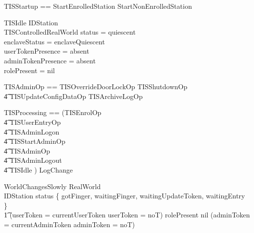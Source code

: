 \begin{zed}
        TISStartup == StartEnrolledStation \lor
        StartNonEnrolledStation
\end{zed}

\begin{schema}{TISIdle}
        \Xi IDStation
\\      \Xi TISControlledRealWorld
\where
        status = quiescent
\\      enclaveStatus = enclaveQuiescent
\\      userTokenPresence = absent
\\      adminTokenPresence = absent
\\      rolePresent = nil
\end{schema}

\begin{zed}
        TISAdminOp == TISOverrideDoorLockOp  \lor TISShutdownOp 
\\      \t4     \lor TISUpdateConfigDataOp \lor TISArchiveLogOp
\end{zed}

\begin{zed}
        TISProcessing == (TISEnrolOp
\\ \t4  \lor TISUserEntryOp
\\ \t4  \lor TISAdminLogon 
\\ \t4  \lor TISStartAdminOp
\\ \t4  \lor TISAdminOp 
\\ \t4  \lor TISAdminLogout
\\ \t4  \lor TISIdle ) \land LogChange
\end{zed}

\begin{schema}{WorldChangesSlowly}
RealWorld
\\ IDStation
\where
status \in \{ gotFinger, waitingFinger, waitingUpdateToken,
waitingEntry \} \implies
\\ \t1
(userToken = 
currentUserToken 
\lor userToken = noT)
\also
rolePresent \neq nil \implies
(adminToken = 
currentAdminToken 
\lor adminToken = noT)
\end{schema}
